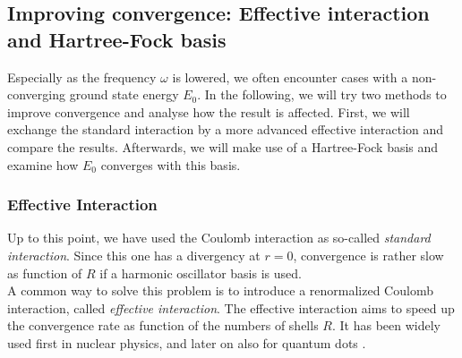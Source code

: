 \subsection{Improving convergence: Effective interaction and Hartree-Fock basis}
\label{subsec:FreeEffAndHF}

Especially as the frequency $\omega$ is lowered, we often encounter cases with a non-converging ground state energy $E_0$. In the following, we will try two methods to improve convergence and analyse how the result is affected. First, we will exchange the standard interaction by a more advanced effective interaction and compare the results. Afterwards, we will make use of a Hartree-Fock basis and examine how $E_0$ converges with this basis.


\subsubsection{Effective Interaction}

Up to this point, we have used the Coulomb interaction as so-called \textit{standard interaction}. Since this one has a divergency at $r=0$, convergence is rather slow as function of $R$ if a harmonic oscillator basis is used. \\
A common way to solve this problem is to introduce a renormalized Coulomb interaction, called \textit{effective interaction}. The effective interaction aims to speed up the convergence rate as function of the numbers of shells $R$. It has been widely used first in nuclear physics, and later on also for quantum dots \cite{PhysRevB.84.115302}.

